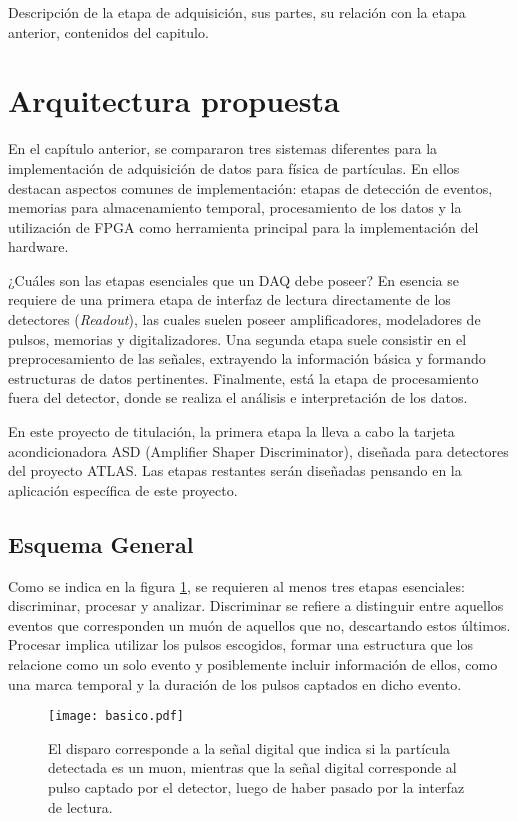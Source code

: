 Descripción de la etapa de adquisición, sus partes, su relación con la etapa anterior, contenidos del capitulo.

\section{Arquitectura propuesta}
\label{sec:arq}

En el capítulo anterior, se compararon tres sistemas diferentes para la implementación de adquisición de datos para física de partículas. En ellos destacan aspectos comunes de implementación: etapas de detección de eventos, memorias para almacenamiento temporal, procesamiento de los datos y la utilización de FPGA como herramienta principal para la implementación del hardware.

¿Cuáles son las etapas esenciales que un DAQ debe poseer? En esencia se requiere de una primera etapa de interfaz de lectura directamente de los detectores (\textit{Readout}), las cuales suelen poseer amplificadores, modeladores de pulsos, memorias y digitalizadores. Una segunda etapa suele consistir en el preprocesamiento de las señales, extrayendo la información básica y formando estructuras de datos pertinentes. Finalmente, está la etapa de procesamiento fuera del detector, donde se realiza el análisis e interpretación de los datos.

En este proyecto de titulación, la primera etapa la lleva a cabo la tarjeta acondicionadora ASD (Amplifier Shaper Discriminator), diseñada para detectores del proyecto ATLAS. Las etapas restantes serán diseñadas pensando en la aplicación específica de este proyecto.



\subsection{Esquema General}
	Como se indica en la figura \ref{img:diagrama}, se requieren al menos tres etapas esenciales: discriminar, procesar y analizar. Discriminar se refiere a distinguir entre aquellos eventos que corresponden un muón de aquellos que no, descartando estos últimos. Procesar implica utilizar los pulsos escogidos, formar una estructura que los relacione como un solo evento y posiblemente incluir información de ellos, como una marca temporal y la duración de los pulsos captados en dicho evento. 
	
	\begin{figure}[h]
		\centering
		\texttt{[image: basico.pdf]}
		\caption{El disparo corresponde a la señal digital que indica si la partícula detectada es un muon, mientras que la señal digital corresponde al pulso captado por el detector, luego de haber pasado por la interfaz de lectura.}
		\label{img:diagrama}
	\end{figure}

